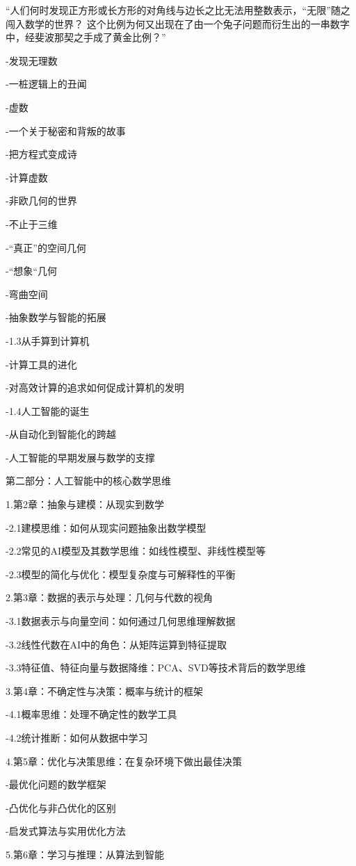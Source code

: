 “人们何时发现正方形或长方形的对角线与边长之比无法用整数表示，“无限”随之闯入数学的世界？
这个比例为何又出现在了由一个兔子问题而衍生出的一串数字中，经斐波那契之手成了黄金比例？”

-发现无理数

-一桩逻辑上的丑闻

-虚数

-一个关于秘密和背叛的故事

-把方程式变成诗

-计算虚数

-非欧几何的世界

-不止于三维

-“真正”的空间几何

-“想象“几何

-弯曲空间

-抽象数学与智能的拓展

-1.3从手算到计算机

-计算工具的进化

-对高效计算的追求如何促成计算机的发明

-1.4人工智能的诞生

-从自动化到智能化的跨越

-人工智能的早期发展与数学的支撑

    第二部分：人工智能中的核心数学思维

1.第2章：抽象与建模：从现实到数学

-2.1建模思维：如何从现实问题抽象出数学模型

-2.2常见的AI模型及其数学思维：如线性模型、非线性模型等

-2.3模型的简化与优化：模型复杂度与可解释性的平衡

2.第3章：数据的表示与处理：几何与代数的视角

-3.1数据表示与向量空间：如何通过几何思维理解数据

-3.2线性代数在AI中的角色：从矩阵运算到特征提取

-3.3特征值、特征向量与数据降维：PCA、SVD等技术背后的数学思维

3.第4章：不确定性与决策：概率与统计的框架

-4.1概率思维：处理不确定性的数学工具

-4.2统计推断：如何从数据中学习

4.第5章：优化与决策思维：在复杂环境下做出最佳决策

-最优化问题的数学框架

-凸优化与非凸优化的区别

-启发式算法与实用优化方法

5.第6章：学习与推理：从算法到智能

